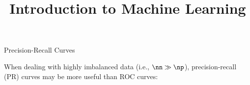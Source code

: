 



\newcommand{\titlefigure}{figure_man/roc-confusion_matrix.png}
\newcommand{\learninggoals}{
  \item \textcolor{blue}{XXX}
  \item \textcolor{blue}{XXX}
}

\title{Introduction to Machine Learning}
\date{}



\begin{vbframe}{Precision-Recall Curves}

\begin{footnotesize}
When dealing with highly imbalanced data (i.e., $\nn \gg \np$), precision-recall (PR) curves may be more useful than ROC curves:


\end{footnotesize}
\end{vbframe}
